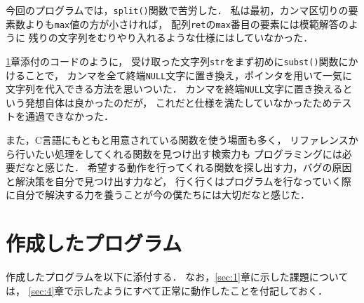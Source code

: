 \documentclass[autodetect-engine,dvi=dvipdfmx,ja=standard,
               a4j,11pt]{bxjsarticle}
\begin{document}
今回のプログラムでは，\verb|split()|関数で苦労した．
私は最初，カンマ区切りの要素数よりも\verb|max|値の方が小さければ，
配列\verb|ret|の\verb|max|番目の要素には模範解答のように
残りの文字列をむりやり入れるような仕様にはしていなかった．

\ref{sec:8}章添付のコードのように，
受け取った文字列\verb|str|をまず初めに\verb|subst()|関数にかけることで，
カンマを全て終端\verb|NULL|文字に置き換え，ポインタを用いて一気に文字列を代入できる方法を思いついた．
カンマを終端\verb|NULL|文字に置き換えるという発想自体は良かったのだが，
これだと仕様を満たしていなかったためテストを通過できなかった．

また，C言語にもともと用意されている関数を使う場面も多く，
リファレンスから行いたい処理をしてくれる関数を見つけ出す検索力も
プログラミングには必要だなと感じた．
希望する動作を行ってくれる関数を探し出す力，バグの原因と解決策を自分で見つけ出す力など，
行く行くはプログラムを行なっていく際に自分で解決する力を養うことが今の僕たちには大切だなと感じた．


\section{作成したプログラム} \label{sec:8}

作成したプログラムを以下に添付する．
なお，\ref{sec:1}章に示した課題については，
\ref{sec:4}章で示したようにすべて正常に動作したことを付記しておく．
\end{document}
